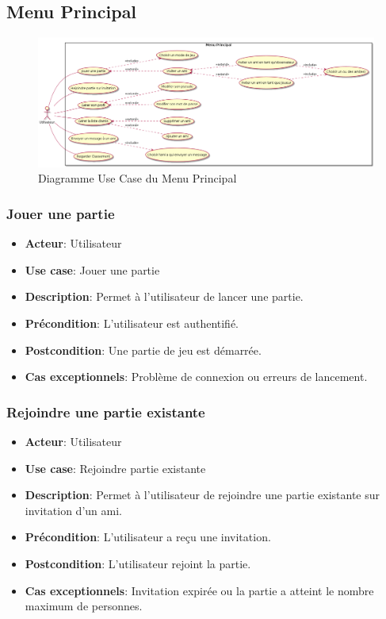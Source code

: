 \documentclass{article}
\begin{document}
\subsection{Menu Principal}

\begin{figure}[!h]
    \centering
    	\includegraphics[width=1.5\textwidth]{./uml/usescase/menu-principal/menu_principal.png}
    	\caption{Diagramme Use Case du Menu Principal}
    	\label{fig:main-menu}
    	
\end{figure}

\subsubsection*{Jouer une partie}
\begin{itemize}
    \item \textbf{Acteur}: Utilisateur
    \item \textbf{Use case}: Jouer une partie
    \item \textbf{Description}: Permet à l'utilisateur de lancer une partie.
    \item \textbf{Précondition}: L'utilisateur est authentifié.
    \item \textbf{Postcondition}: Une partie de jeu est démarrée.
    \item \textbf{Cas exceptionnels}: Problème de connexion ou erreurs de lancement.
\end{itemize}

\subsubsection*{Rejoindre une partie existante}
\begin{itemize}
    \item \textbf{Acteur}: Utilisateur
    \item \textbf{Use case}: Rejoindre partie existante
    \item \textbf{Description}: Permet à l'utilisateur de rejoindre une partie existante sur invitation d'un ami.
    \item \textbf{Précondition}: L'utilisateur a reçu une invitation.
    \item \textbf{Postcondition}: L'utilisateur rejoint la partie.
    \item \textbf{Cas exceptionnels}: Invitation expirée ou la partie a atteint le nombre maximum de personnes.
\end{itemize}
\end{document}
